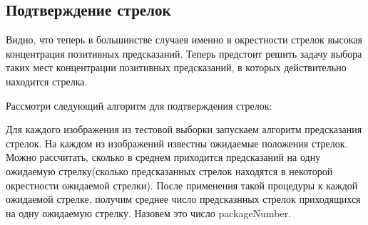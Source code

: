 \subsection{Подтверждение стрелок}
\label{crossDetection}
Видно, что теперь в большинстве случаев именно в окрестности стрелок высокая концентрация позитивных предсказаний. Теперь предстоит решить задачу выбора таких мест концентрации позитивных предсказаний, в которых действительно находится стрелка. 

Рассмотри следующий алгоритм для подтверждения стрелок:

Для каждого изображения из тестовой выборки запускаем алгоритм предсказания стрелок. На каждом из изображений известны ожидаемые положения стрелок. Можно рассчитать, сколько в среднем приходится предсказаний на одну ожидаемую стрелку(сколько предсказанных стрелок находятся в некоторой окрестности ожидаемой стрелки). После применения такой процедуры к каждой ожидаемой стрелке, получим среднее число предсказнных стрелок приходящихся на одну ожидаемую стрелку. Назовем это число packageNumber.


